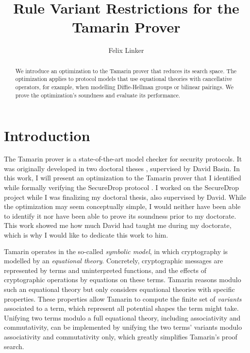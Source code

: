 \documentclass[envcountsame,orivec]{llncs}
\begin{document}
\title{Rule Variant Restrictions for the Tamarin Prover}

\author{Felix Linker}

\maketitle

\begin{abstract}
  We introduce an optimization to the Tamarin prover that reduces its search space.
  The optimization applies to protocol models that use equational theories with cancellative operators, for example, when modelling Diffie-Hellman groups or bilinear pairings.
  We prove the optimization's soundness and evaluate its performance.
\end{abstract}


\section{Introduction}

The Tamarin prover \cite{CAVtamarin,CSFtamarin} is a state-of-the-art model checker for security protocols.
It was originally developed in two doctoral theses \cite{TamarinThesisInduction,TamarinThesisConstraintSolving}, supervised by David Basin.
In this work, I will present an optimization to the Tamarin prover that I identified while formally verifying the SecureDrop protocol \cite{SecureDrop}.
I worked on the SecureDrop project while I was finalizing my doctoral thesis, also supervised by David.
While the optimization may seem conceptually simple, I would neither have been able to identify it nor have been able to prove its soundness prior to my doctorate.
This work showed me how much David had taught me during my doctorate, which is why I would like to dedicate this work to him.

Tamarin operates in the so-called \emph{symbolic model}, in which cryptography is modelled by an \emph{equational theory}.
Concretely, cryptographic messages are represented by terms and uninterpreted functions, and the effects of cryptographic operations by equations on these terms.
Tamarin reasons modulo such an equational theory but only considers equational theories with specific properties.
These properties allow Tamarin to compute the finite set of \emph{variants} associated to a term, which represent all potential shapes the term might take.
Unifying two terms modulo a full equational theory, including associativity and commutativity, can be implemented by unifying the two terms' variants modulo associativity and commutativity only, which greatly simplifies Tamarin's proof search.
\end{document}
